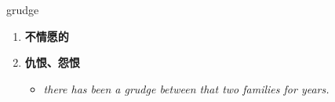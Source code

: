 
\begin{frame}
{\huge grudge}
\begin{center}
\begin{enumerate}\Large
  \item \textbf{不情愿的}
  \item \textbf{仇恨、怨恨}
  \begin{itemize}
    \item \em{\Large{there has been a grudge between that two families for years.}}
  \end{itemize}
\end{enumerate}
\end{center}
\end{frame}
